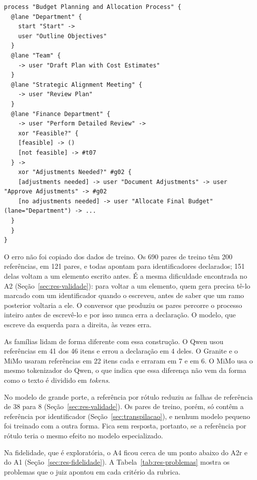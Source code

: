 \begin{lstlisting}[float=htb,caption={Saída inválida do A4 no pmo\_14, com a linha do último ramo encurtada},label={lst:falha-ref},basicstyle=\ttfamily\scriptsize]
process "Budget Planning and Allocation Process" {
  @lane "Department" {
    start "Start" ->
    user "Outline Objectives"
  }
  @lane "Team" {
    -> user "Draft Plan with Cost Estimates"
  }
  @lane "Strategic Alignment Meeting" {
    -> user "Review Plan"
  }
  @lane "Finance Department" {
    -> user "Perform Detailed Review" ->
    xor "Feasible?" {
    [feasible] -> ()
    [not feasible] -> #t07
  } ->
    xor "Adjustments Needed?" #g02 {
    [adjustments needed] -> user "Document Adjustments" -> user "Approve Adjustments" -> #g02
    [no adjustments needed] -> user "Allocate Final Budget" (lane="Department") -> ...
  }
  }
}
\end{lstlisting}

O erro não foi copiado dos dados de treino. Os 690 pares de treino têm 200 referências, em 121 pares, e todas apontam para identificadores declarados; 151 delas voltam a um elemento escrito antes. É a mesma dificuldade encontrada no A2 (Seção~\ref{sec:res-validade}): para voltar a um elemento, quem gera precisa tê-lo marcado com um identificador quando o escreveu, antes de saber que um ramo posterior voltaria a ele. O conversor que produziu os pares percorre o processo inteiro antes de escrevê-lo e por isso nunca erra a declaração. O modelo, que escreve da esquerda para a direita, às vezes erra.

As famílias lidam de forma diferente com essa construção. O Qwen usou referências em 41 dos 46 itens e errou a declaração em 4 deles. O Granite e o MiMo usaram referências em 22 itens cada e erraram em 7 e em 6. O MiMo usa o mesmo tokenizador do Qwen, o que indica que essa diferença não vem da forma como o texto é dividido em \textit{tokens}.

No modelo de grande porte, a referência por rótulo reduziu as falhas de referência de 38 para 8 (Seção~\ref{sec:res-validade}). Os pares de treino, porém, só contêm a referência por identificador (Seção~\ref{sec:transpilacao}), e nenhum modelo pequeno foi treinado com a outra forma. Fica sem resposta, portanto, se a referência por rótulo teria o mesmo efeito no modelo especializado.

Na fidelidade, que é exploratória, o A4 ficou cerca de um ponto abaixo do A2r e do A1 (Seção~\ref{sec:res-fidelidade}). A Tabela~\ref{tab:res-problemas} mostra os problemas que o juiz apontou em cada critério da rubrica.

